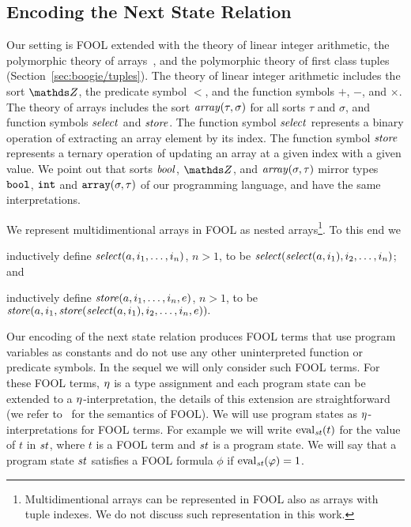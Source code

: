 \subsection{Encoding the Next State Relation}\label{sec:boogie/next-state/encoding}

Our setting is FOOL extended with the theory of linear integer arithmetic, the polymorphic theory of arrays~\cite{VampireAndFOOL}, and the polymorphic theory of first class tuples (Section~\ref{sec:boogie/tuples}). The theory of linear integer arithmetic includes the sort $\Z$, the predicate symbol $<$, and the function symbols $+$, $-$, and $\times$. The theory of arrays includes the sort $\mathit{array}(\tau,\sigma)$ for all sorts $\tau$ and $\sigma$, and function symbols $\mathit{select}$ and $\mathit{store}$. The function symbol $\mathit{select}$ represents a binary operation of extracting an array element by its index. The function symbol $\mathit{store}$ represents a ternary operation of updating an array at a given index with a given value. We point out that sorts $\mathit{bool}$, $\Z$, and $\mathit{array}(\sigma,\tau)$ mirror types $\mathtt{bool}$, $\mathtt{int}$ and $\mathtt{array}(\sigma,\tau)$ of our programming language, and have the same interpretations.

We represent multidimentional arrays in FOOL as nested arrays\footnote{Multidimentional arrays can be represented in FOOL also as arrays with tuple indexes. We do not discuss such representation in this work.}. To this end we
\begin{enumerate*}[label=(\roman*)]
  \item inductively define $\mathit{select}({a},\allowbreak{i_1,\allowbreak\ldots,\allowbreak i_n})$, $n > 1$, to be $\mathit{select}({\mathit{select}({a},\allowbreak{i_1})},\allowbreak{i_2,\ldots,i_n})$; and
  \item inductively define $\mathit{store}({a},\allowbreak{i_1,\allowbreak\ldots,\allowbreak i_n},\allowbreak{e})$, $n > 1$, to be $\mathit{store}({a},\allowbreak{i_1},\allowbreak{\mathit{store}({\mathit{select}({a},\allowbreak{i_1})},\allowbreak{i_2,\allowbreak\ldots,\allowbreak i_n},\allowbreak{e})}).$
\end{enumerate*}

Our encoding of the next state relation produces FOOL terms that use program variables as constants and do not use any other uninterpreted function or predicate symbols. In the sequel we will only consider such FOOL terms. For these FOOL terms, $\eta$ is a type assignment and each program state can be extended to a $\eta$-interpretation, the details of this extension are straightforward (we refer to~\cite{FOOL} for the semantics of FOOL). We will use program states as $\eta$-interpretations for FOOL terms. For example we will write $\mathrm{eval}_{\mathit{st}}({t})$ for the value of $t$ in $\mathit{st}$, where $t$ is a FOOL term and $\mathit{st}$ is a program state. We will say that a program state $\mathit{st}$ satisfies a FOOL formula $\phi$ if $\mathrm{eval}_{\mathit{st}}({\varphi}) = 1$.

